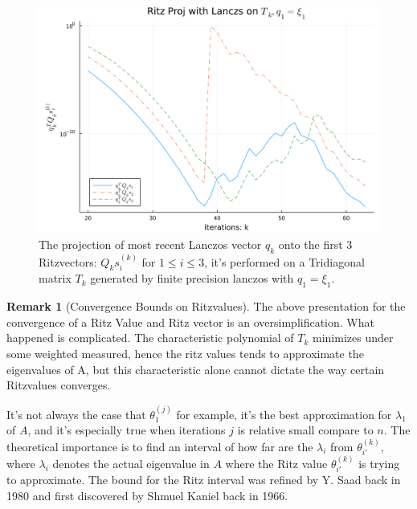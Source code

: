 \documentclass[]{article}
\theoremstyle{definition}
\newtheorem{remark}{Remark}[subsection]  %
\begin{document}
            \begin{figure}[H]
                \centering 
                \includegraphics[width=14cm]{ritz_proj_tridiagonal.png}
                \caption{The projection of most recent Lanczos vector $q_k$ onto the first 3 Ritzvectors: $Q_ks_i^{(k)}$ for $1\le i \le 3$, it's performed on a Tridiagonal matrix $T_k$ generated by finite precision lanczos with $q_1 = \xi_1$. }
            \end{figure}\label{fig:6}
            \begin{remark}[Convergence Bounds on Ritzvalues]
                The above presentation for the convergence of a Ritz Value and Ritz vector is an oversimplification. What happened is complicated. The characteristic polynomial of $T_k$ minimizes under some weighted measured, hence the ritz values tends to approximate the eigenvalues of A, but this characteristic alone cannot dictate the way certain Ritzvalues converges.
                \par
                It's not always the case that $\theta_1^{(j)}$ for example, it's the best approximation for $\lambda_1$ of $A$, and it's especially true when iterations $j$ is relative small compare to $n$. The theoretical importance is to find an interval of how far are the $\lambda_i$ from $\theta_{i'}^{(k)}$, where $\lambda_i$ denotes the actual eigenvalue in $A$ where the Ritz value $\theta_{i'}^{(k)}$ is trying to approximate. The bound for the Ritz interval was refined by Y. Saad back in 1980\cite{paper:saad_ritz_convergence} and first discovered by Shmuel Kaniel back in 1966\cite{paper:kaniel1966}. 
            \end{remark}
\end{document}
